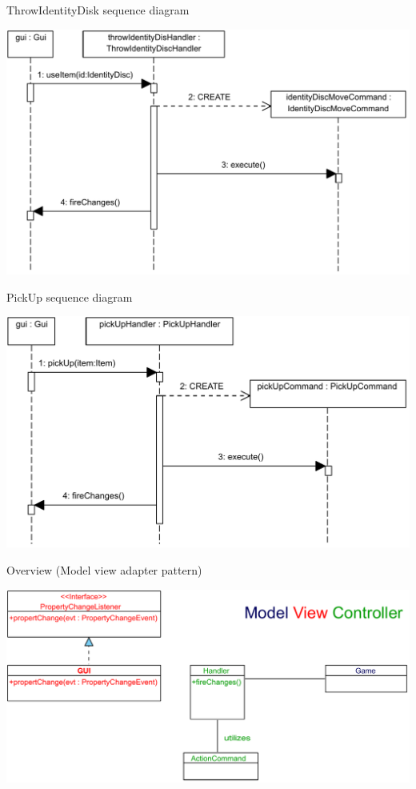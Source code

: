 \documentclass[11pt,t]{beamer}
\begin{document}
\begin{frame}{ThrowIdentityDisk sequence diagram}
\begin{center}
\includegraphics[scale=0.45]{images/throwIdentityDischandlerseq}
\end{center}
\end{frame}

\begin{frame}{PickUp sequence diagram}
\begin{center}
\includegraphics[scale=0.45]{images/PickUpItemhandlerseq}
\end{center}
\end{frame}

\begin{frame}{Overview (Model view adapter pattern)}
\begin{center}
\includegraphics[width=0.9\linewidth]{images/mvc}
\end{center}
\end{frame}
\end{document}
